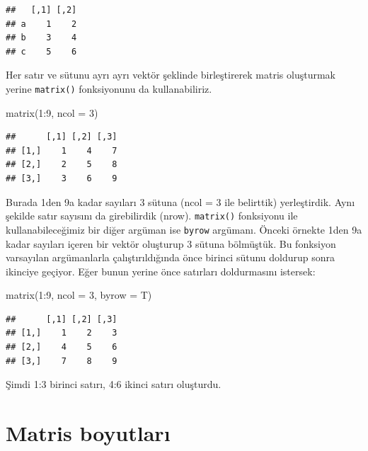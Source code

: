 \documentclass[
]{book}
\newenvironment{Shaded}{\begin{snugshade}}{\end{snugshade}}
\newcommand{\AttributeTok}[1]{\textcolor[rgb]{0.77,0.63,0.00}{#1}}
\newcommand{\DecValTok}[1]{\textcolor[rgb]{0.00,0.00,0.81}{#1}}
\newcommand{\FunctionTok}[1]{\textcolor[rgb]{0.00,0.00,0.00}{#1}}
\newcommand{\NormalTok}[1]{#1}
\newcommand{\SpecialCharTok}[1]{\textcolor[rgb]{0.00,0.00,0.00}{#1}}
\begin{document}
\begin{verbatim}
##   [,1] [,2]
## a    1    2
## b    3    4
## c    5    6
\end{verbatim}

Her satır ve sütunu ayrı ayrı vektör şeklinde birleştirerek matris oluşturmak yerine \texttt{matrix()} fonksiyonunu da kullanabiliriz.

\begin{Shaded}
\begin{Highlighting}[]
\FunctionTok{matrix}\NormalTok{(}\DecValTok{1}\SpecialCharTok{:}\DecValTok{9}\NormalTok{, }\AttributeTok{ncol =} \DecValTok{3}\NormalTok{)}
\end{Highlighting}
\end{Shaded}

\begin{verbatim}
##      [,1] [,2] [,3]
## [1,]    1    4    7
## [2,]    2    5    8
## [3,]    3    6    9
\end{verbatim}

Burada 1den 9a kadar sayıları 3 sütuna (ncol = 3 ile belirttik) yerleştirdik. Aynı şekilde satır sayısını da girebilirdik (nrow). \texttt{matrix()} fonksiyonu ile kullanabileceğimiz bir diğer argüman ise \texttt{byrow} argümanı. Önceki örnekte 1den 9a kadar sayıları içeren bir vektör oluşturup 3 sütuna bölmüştük. Bu fonksiyon varsayılan argümanlarla çalıştırıldığında önce birinci sütunu doldurup sonra ikinciye geçiyor. Eğer bunun yerine önce satırları doldurmasını istersek:

\begin{Shaded}
\begin{Highlighting}[]
\FunctionTok{matrix}\NormalTok{(}\DecValTok{1}\SpecialCharTok{:}\DecValTok{9}\NormalTok{, }\AttributeTok{ncol =} \DecValTok{3}\NormalTok{, }\AttributeTok{byrow =}\NormalTok{ T)}
\end{Highlighting}
\end{Shaded}

\begin{verbatim}
##      [,1] [,2] [,3]
## [1,]    1    2    3
## [2,]    4    5    6
## [3,]    7    8    9
\end{verbatim}

Şimdi 1:3 birinci satırı, 4:6 ikinci satırı oluşturdu.

\hypertarget{matris-boyutlarux131}{%
\section{Matris boyutları}\label{matris-boyutlarux131}}
\end{document}
